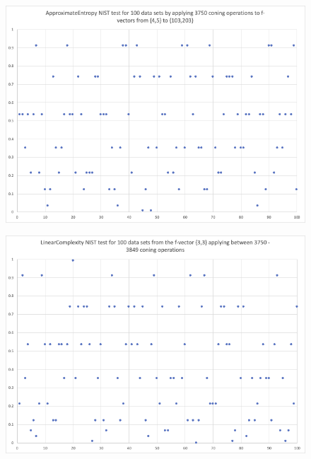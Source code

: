 \documentclass[oneside,12pt]{amsart}
\theoremstyle{definition}
\numberwithin{equation}{section}
\begin{document}
\begin{figure}[h!]
\centering
\includegraphics[scale=.5]{./charts/ApproximateEntropy_4_5.png}
\label{fig:approxentropy45}
\end{figure}

\begin{figure}[h!]
\centering
\includegraphics[scale=.5]{./charts/LinearComplexity_3_3.png}
\label{fig:linear33}
\end{figure}
\end{document}
